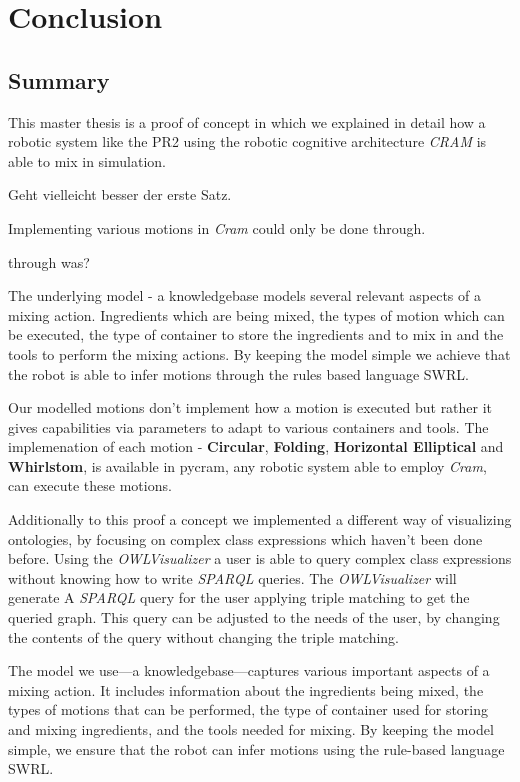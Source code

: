 \chapter{Conclusion}
\label{chap:conclusion}

\section{Summary}
This master thesis is a proof of concept in which we explained in detail how a robotic system like the PR2 
using the robotic cognitive architecture \textit{CRAM} is able to mix in simulation. 

Geht vielleicht besser der erste Satz.

Implementing various motions in \textit{Cram} could only be done through.

through was?


The underlying model - a knowledgebase models several relevant aspects of a mixing action. 
Ingredients which are being mixed, the types of motion which can be executed, the type of container to 
store the ingredients and to mix in and the tools to perform the mixing actions. By keeping the model simple we achieve that the robot 
is able to infer motions through the rules based language SWRL. 

Our modelled motions don't implement how a motion is executed but rather it gives capabilities via parameters to adapt 
to various containers and tools. The implemenation of each motion - \textbf{Circular}, \textbf{Folding}, \textbf{Horizontal Elliptical} 
and \textbf{Whirlstom}, is available in pycram, any robotic system able to employ \textit{Cram}, can execute these motions. 

Additionally to this proof a concept we implemented a different way of visualizing ontologies, by focusing 
on complex class expressions which haven't been done before. Using the \textit{OWLVisualizer} a user is able to query 
complex class expressions without knowing how to write \textit{SPARQL} queries. The \textit{OWLVisualizer} will generate A
\textit{SPARQL} query for the user applying triple matching to get the queried graph. This query can be adjusted 
to the needs of the user, by changing the contents of the query without changing the triple matching. 


The model we use—a knowledgebase—captures various important aspects of a mixing action. It includes information about the ingredients being mixed, the types of motions that can be performed, the type of container used for storing and mixing ingredients, and the tools needed for mixing. By keeping the model simple, we ensure that the robot can infer motions using the rule-based language SWRL.

